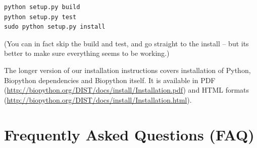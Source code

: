 \documentclass{report}
\begin{document}
\begin{verbatim}
python setup.py build
python setup.py test
sudo python setup.py install
\end{verbatim}

\noindent (You can in fact skip the build and test, and go straight to the install --
but its better to make sure everything seems to be working.)

The longer version of our installation instructions covers
installation of Python, Biopython dependencies and Biopython itself.
It is available in PDF
(\url{http://biopython.org/DIST/docs/install/Installation.pdf})
and HTML formats
(\url{http://biopython.org/DIST/docs/install/Installation.html}).

\section{Frequently Asked Questions (FAQ)}
\end{document}
